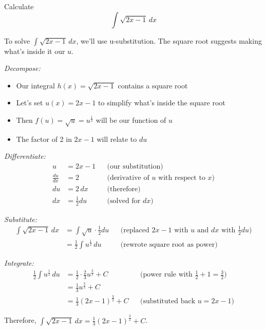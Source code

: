\documentclass{article}
\begin{document}
  \begin{exercise}
    Calculate 
    \begin{equation}
      \int \sqrt{2x - 1} \,dx 
    \end{equation}
  \end{exercise}
  \begin{solution}
    To solve $\int \sqrt{2x - 1} \,dx$, we'll use u-substitution. The square root suggests making what's inside it our $u$.
    
    \textit{Decompose:}
    \begin{itemize}
      \item Our integral $h(x) = \sqrt{2x - 1}$ contains a square root
      \item Let's set $u(x) = 2x - 1$ to simplify what's inside the square root
      \item Then $f(u) = \sqrt{u} = u^{\frac{1}{2}}$ will be our function of $u$
      \item The factor of 2 in $2x - 1$ will relate to $du$
    \end{itemize}

    \textit{Differentiate:}
    \begin{align*}
      u &= 2x - 1 && \text{(our substitution)} \\
      \frac{du}{dx} &= 2 && \text{(derivative of $u$ with respect to $x$)} \\
      du &= 2\,dx && \text{(therefore)} \\
      dx &= \frac{1}{2}du && \text{(solved for $dx$)}
    \end{align*}

    \textit{Substitute:}
    \begin{align*}
      \int \sqrt{2x - 1} \,dx &= \int \sqrt{u} \cdot \frac{1}{2}du && \text{(replaced $2x - 1$ with $u$ and $dx$ with $\frac{1}{2}du$)} \\
      &= \frac{1}{2}\int u^{\frac{1}{2}} \,du && \text{(rewrote square root as power)}
    \end{align*}

    \textit{Integrate:}
    \begin{align*}
      \frac{1}{2}\int u^{\frac{1}{2}} \,du &= \frac{1}{2} \cdot \frac{2}{3}u^{\frac{3}{2}} + C && \text{(power rule with $\frac{1}{2} + 1 = \frac{3}{2}$)} \\
      &= \frac{1}{3}u^{\frac{3}{2}} + C \\
      &= \frac{1}{3}(2x - 1)^{\frac{3}{2}} + C && \text{(substituted back $u = 2x - 1$)}
    \end{align*}

    Therefore, $\int \sqrt{2x - 1} \,dx = \frac{1}{3}(2x - 1)^{\frac{3}{2}} + C$.
  \end{solution}
\end{document}
